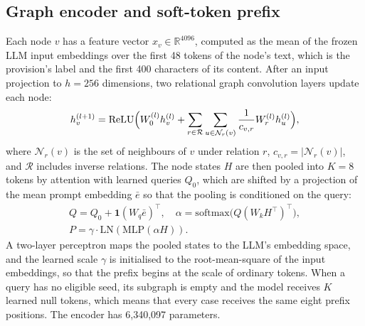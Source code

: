 \documentclass[journal]{IEEEtran}
\begin{document}
\subsection{Graph encoder and soft-token prefix}
Each node $v$ has a feature vector $x_v\in\mathbb{R}^{4096}$, computed as the mean of the frozen LLM input embeddings over the first 48 tokens of the node's text, which is the provision's label and the first 400 characters of its content. After an input projection to $h=256$ dimensions, two relational graph convolution layers \cite{r32} update each node:
\begin{equation}
h_v^{(l+1)}=\mathrm{ReLU}\Bigl(W_0^{(l)}h_v^{(l)}+\sum_{r\in\mathcal{R}}\sum_{u\in\mathcal{N}_r(v)}\frac{1}{c_{v,r}}W_r^{(l)}h_u^{(l)}\Bigr),
\end{equation}
where $\mathcal{N}_r(v)$ is the set of neighbours of $v$ under relation $r$, $c_{v,r}=|\mathcal{N}_r(v)|$, and $\mathcal{R}$ includes inverse relations. The node states $H$ are then pooled into $K=8$ tokens by attention with learned queries $Q_0$, which are shifted by a projection of the mean prompt embedding $\bar e$ so that the pooling is conditioned on the query:
\begin{equation}
\begin{gathered}Q=Q_0+\mathbf{1}(W_q\bar e)^\top,\quad \alpha=\mathrm{softmax}\bigl(Q(W_kH^\top)^\top\bigr),\\ P=\gamma\cdot\mathrm{LN}(\mathrm{MLP}(\alpha H)).\end{gathered}
\end{equation}
A two-layer perceptron maps the pooled states to the LLM's embedding space, and the learned scale $\gamma$ is initialised to the root-mean-square of the input embeddings, so that the prefix begins at the scale of ordinary tokens. When a query has no eligible seed, its subgraph is empty and the model receives $K$ learned null tokens, which means that every case receives the same eight prefix positions. The encoder has 6,340,097 parameters.
\end{document}
